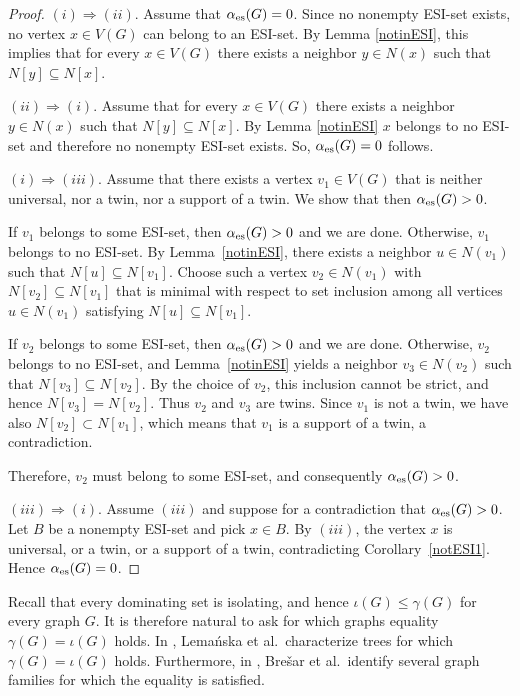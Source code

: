 \documentclass[11pt]{article}
\newcommand{\io}{\iota}
\newcommand{\es}{\alpha_{\rm es}}
\begin{document}
\begin{proof} 
$(i)\Rightarrow (ii)$. Assume that $\es(G)=0$. Since no nonempty ESI-set exists, no vertex $x\in V(G)$ can belong to an ESI-set. By Lemma \ref{notinESI}, this implies that for every $x\in V(G)$ there exists a neighbor $y\in N(x)$ such that $N[y]\subseteq N[x]$.

$(ii)\Rightarrow (i)$. Assume that for every $x\in V(G)$ there exists a neighbor $y\in N(x)$ such that $N[y]\subseteq N[x]$. By  Lemma \ref{notinESI} $x$ belongs to no ESI-set and therefore no nonempty ESI-set exists. So, $\es(G)=0$ follows.

$(i)\Rightarrow(iii)$.
Assume that there exists a vertex $v_1\in V(G)$ that is neither
universal, nor a twin, nor a support of a twin. We show that then $\es(G)>0$.

If $v_1$ belongs to some ESI-set, then $\es(G)>0$ and we are done. Otherwise, $v_1$ belongs to
no ESI-set. By Lemma~\ref{notinESI}, there exists a neighbor $u\in N(v_1)$ such that
$N[u]\subseteq N[v_1]$. Choose such a vertex $v_2\in N(v_1)$ with $N[v_2]\subseteq N[v_1]$
that is minimal with respect to set inclusion among all vertices $u\in N(v_1)$ satisfying
$N[u]\subseteq N[v_1]$.

If $v_2$ belongs to some ESI-set, then $\es(G)>0$ and we are done. Otherwise, $v_2$ belongs to
no ESI-set, and Lemma~\ref{notinESI} yields a neighbor $v_3\in N(v_2)$ such that
$N[v_3]\subseteq N[v_2]$. By the choice of $v_2$, this inclusion cannot be strict,
and hence $N[v_3]=N[v_2]$. Thus $v_2$ and $v_3$ are twins. Since $v_1$ is not a twin, we have also $N[v_2]\subset N[v_1]$, which means that $v_1$ is a support of a twin, a contradiction.

Therefore, $v_2$ must belong to some ESI-set, and consequently $\es(G)>0$.

$(iii)\Rightarrow (i)$.
Assume $(iii)$ and suppose for a contradiction that $\es(G)>0$. Let $B$ be a nonempty ESI-set
and pick $x\in B$. By $(iii)$, the vertex $x$ is universal, or a twin, or a support of a twin,
contradicting Corollary~\ref{notESI1}. Hence $\es(G)=0$.
\end{proof}

Recall that every dominating set is isolating, and hence $\io(G)\le \gamma(G)$ for every graph $G$. It is therefore natural to ask for which graphs equality $\gamma(G)=\io(G)$ holds. In \cite{lemanska}, Lemańska et al.\ characterize trees for which $\gamma(G)=\iota(G)$ holds. Furthermore, in \cite{BDJK}, Brešar et al.\ identify several graph families for which the equality is satisfied.
\end{document}
